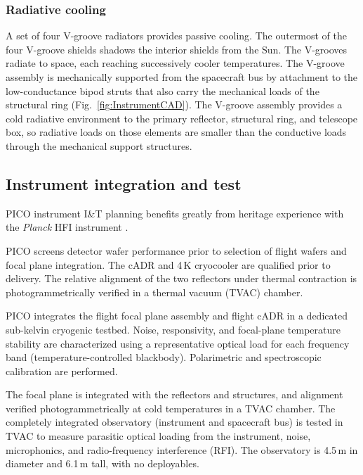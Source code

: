 \subsubsection{Radiative cooling}
\label{sec:radiative_cooling} %

A set of four V-groove radiators provides passive cooling. The
outermost of the four V-groove shields shadows the interior shields
from the Sun. The V-grooves radiate to space, each reaching
successively cooler temperatures. The V-groove assembly is
mechanically supported from the spacecraft bus by attachment to the
low-conductance bipod struts that also carry the mechanical loads of
the structural ring (Fig.~\ref{fig:InstrumentCAD}). The V-groove
assembly provides a cold radiative environment to the primary
reflector, structural ring, and telescope box, so radiative loads on
those elements are smaller than the conductive loads through the
mechanical support structures.


\subsection{Instrument integration and test}
\label{sec:iandt} %

PICO instrument I\&T planning benefits greatly from heritage
experience with the \textit{Planck} HFI instrument \citep{ Pajot2010}.

PICO screens detector wafer performance prior to selection of
flight wafers and focal plane integration. The cADR and 4\,K
cryocooler are qualified prior to delivery. The relative alignment
of the two reflectors under thermal contraction is
photogrammetrically verified in a thermal vacuum (TVAC) chamber.

PICO integrates the flight focal plane assembly and flight cADR in
a dedicated sub-kelvin cryogenic testbed. Noise, responsivity, and focal-plane
temperature stability are characterized using a representative
optical load for each frequency band (temperature-controlled
blackbody). Polarimetric and spectroscopic calibration are
performed.

The focal plane is integrated with the reflectors and structures, and
alignment verified photogrammetrically at cold temperatures in a TVAC
chamber.  The completely integrated observatory (instrument and
spacecraft bus) is tested in TVAC to measure parasitic optical loading
from the instrument, noise, microphonics, and radio-frequency
interference (RFI). The observatory is 4.5\,m in diameter and 6.1\,m
tall, with no deployables.

